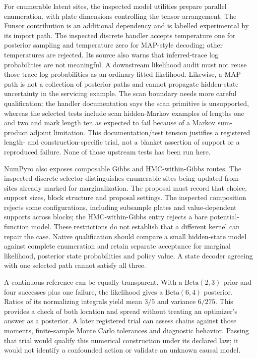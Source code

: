 For enumerable latent sites, the inspected model utilities prepare parallel enumeration, with plate dimensions controlling the tensor arrangement. The Funsor contribution is an additional dependency and is labelled experimental by its import path. The inspected discrete handler accepts temperature one for posterior sampling and temperature zero for MAP-style decoding; other temperatures are rejected. Its source also warns that inferred-trace log probabilities are not meaningful. A downstream likelihood audit must not reuse those trace log probabilities as an ordinary fitted likelihood. Likewise, a MAP path is not a collection of posterior paths and cannot propagate hidden-state uncertainty in the servicing example. The scan boundary needs more careful qualification: the handler documentation says the scan primitive is unsupported, whereas the selected tests include scan hidden-Markov examples of lengths one and two and mark length ten as expected to fail because of a Markov sum-product adjoint limitation. This documentation/test tension justifies a registered length- and construction-specific trial, not a blanket assertion of support or a reproduced failure. None of those upstream tests has been run here. \cite{exec23_numpyro_sources}

NumPyro also exposes composable Gibbs and HMC-within-Gibbs routes. The inspected discrete selector distinguishes enumerable sites being updated from sites already marked for marginalization. The proposal must record that choice, support sizes, block structure and proposal settings. The inspected composition rejects some configurations, including subsample plates and value-dependent supports across blocks; the HMC-within-Gibbs entry rejects a bare potential-function model. These restrictions do not establish that a different kernel can repair the case. Native qualification should compare a small hidden-state model against complete enumeration and retain separate acceptance for marginal likelihood, posterior state probabilities and policy value. A state decoder agreeing with one selected path cannot satisfy all three. \cite{exec23_numpyro_sources}

A continuous reference can be equally transparent. With a $\mathrm{Beta}(2,3)$ prior and four successes plus one failure, the likelihood gives a $\mathrm{Beta}(6,4)$ posterior. Ratios of its normalizing integrals yield mean $3/5$ and variance $6/275$. This provides a check of both location and spread without treating an optimizer's answer as a posterior. A later registered trial can assess chains against those moments, finite-sample Monte Carlo tolerances and diagnostic behavior. Passing that trial would qualify this numerical construction under its declared law; it would not identify a confounded action or validate an unknown causal model. \cite{exec23_numpyro_reference}


